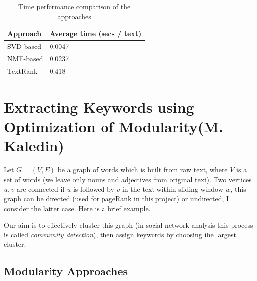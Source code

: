 \documentclass[a4paper]{article}
\begin{document}
    \begin{table}[h!]
        \center
        \begin{tabular}{|p{3cm}|p{2cm}|}
        \hline
        Approach & Average time (secs / text)  \\
        \hline
        SVD-based & 0.0047 \\
        \hline
        NMF-based & 0.0237 \\
        \hline
        TextRank & 0.418 \\
        \hline
        \end{tabular}
        \caption{Time performance comparison of the approaches}
        \label{table:timeres}
	\end{table}


\clearpage

\section*{Extracting Keywords using Optimization of Modularity(M. Kaledin)}

Let $G=(V,E)$ be a graph of words which is built from raw text, where $V$ is a set of words (we leave only nouns and adjectives from original text). Two vertices $u,v$ are connected if $u$ is followed by $v$ in the text within sliding window $w$, this graph can be directed (used for pageRank in this project) or undirected, I consider the latter case. Here is a brief example.

Our aim is to effectively cluster this graph (in social network analysis this process is called \textit{community detection}), then assign keywords by choosing the largest cluster.

\subsection*{Modularity Approaches}
\end{document}
